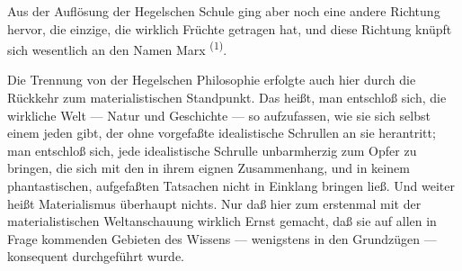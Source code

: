 Aus der Auflösung der Hegelschen Schule ging aber noch eine
andere Richtung hervor, die einzige, die wirklich Früchte getragen hat,
und diese Richtung knüpft sich wesentlich an den Namen
Marx \textsuperscript{(1)}.

Die Trennung von der Hegelschen Philosophie erfolgte auch hier
durch die Rückkehr zum materialistischen Standpunkt. Das heißt, man
entschloß sich, die wirkliche Welt --- Natur und Geschichte --- so
aufzufassen, wie sie sich selbst einem jeden gibt, der ohne vorgefaßte
idealistische Schrullen an sie herantritt; man entschloß sich, jede
idealistische Schrulle unbarmherzig zum Opfer zu bringen, die sich mit
den in ihrem eignen Zusammenhang, und in keinem phantastischen,
aufgefaßten Tatsachen nicht in Einklang bringen ließ. Und weiter heißt
Materialismus überhaupt nichts. Nur daß hier zum erstenmal mit der
materialistischen Weltanschauung wirklich Ernst gemacht, daß sie auf
allen in Frage kommenden Gebieten des Wissens --- wenigstens in den
Grundzügen --- konsequent durchgeführt wurde.

